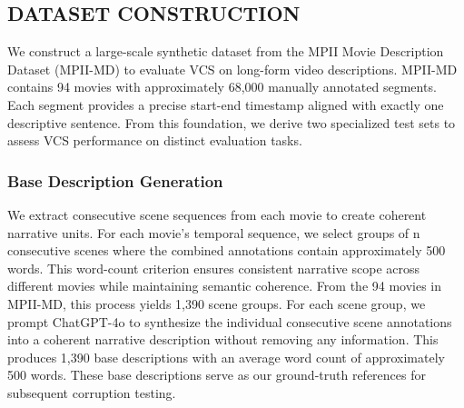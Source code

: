 \documentclass[main.tex]{subfiles}
\begin{document}
\subsection{DATASET CONSTRUCTION}

We construct a large-scale synthetic dataset from the MPII Movie Description Dataset (MPII-MD) \cite{rohrbach2015dataset} to evaluate VCS on long-form video descriptions. MPII-MD contains 94 movies with approximately 68,000 manually annotated segments. Each segment provides a precise start-end timestamp aligned with exactly one descriptive sentence. From this foundation, we derive two specialized test sets to assess VCS performance on distinct evaluation tasks.

\subsubsection{Base Description Generation}
We extract consecutive scene sequences from each movie to create coherent narrative units. For each movie's temporal sequence, we select groups of n consecutive scenes where the combined annotations contain approximately 500 words. This word-count criterion ensures consistent narrative scope across different movies while maintaining semantic coherence. From the 94 movies in MPII-MD, this process yields 1,390 scene groups. For each scene group, we prompt ChatGPT-4o to synthesize the individual consecutive scene annotations into a coherent narrative description without removing any information. This produces 1,390 base descriptions with an average word count of approximately 500 words. These base descriptions serve as our ground-truth references for subsequent corruption testing.
\end{document}
